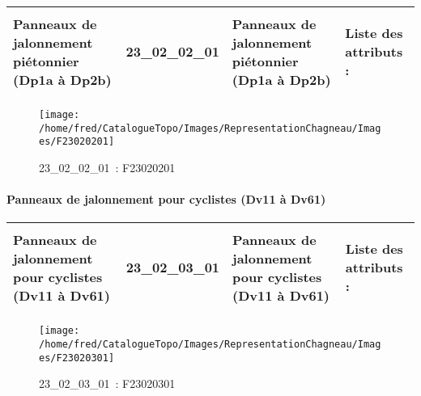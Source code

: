 \documentclass[12pt,titlepage,oneside]{book}
\begin{document}
\renewcommand{\arraystretch}{1.2}
\begin{supertabular}{|p{10cm}|c|p{13cm}|p{12cm}|}
 Panneaux de jalonnement piétonnier (Dp1a à Dp2b) & 23\_02\_02\_01 & Panneaux de jalonnement piétonnier (Dp1a à Dp2b) & Liste des attributs :
\begin{enumerate}
\end{enumerate}
\\
\hline
\end{supertabular}
\begin{figure}[h!]
  \hfill         %
  \begin{minipage}[t]{3cm}
    \begin{center}
      \texttt{[image: /home/fred/CatalogueTopo/Images/RepresentationChagneau/Images/F23020201]}
      \caption[~23\_02\_02\_01]{\small{23\_02\_02\_01~:} \tiny{F23020201}}\label{F23020201}
    \end{center}
  \end{minipage}
\end{figure}


\paragraph{Panneaux de jalonnement pour cyclistes (Dv11 à Dv61)}
\noindent
\vspace{\baselineskip}

\renewcommand{\arraystretch}{1.2}
\begin{supertabular}{|p{10cm}|c|p{13cm}|p{12cm}|}
 Panneaux de jalonnement pour cyclistes (Dv11 à Dv61) & 23\_02\_03\_01 & Panneaux de jalonnement pour cyclistes (Dv11 à Dv61) & Liste des attributs :
\begin{enumerate}
\end{enumerate}
\\
\hline
\end{supertabular}
\begin{figure}[h!]
  \hfill         %
  \begin{minipage}[t]{3cm}
    \begin{center}
      \texttt{[image: /home/fred/CatalogueTopo/Images/RepresentationChagneau/Images/F23020301]}
      \caption[~23\_02\_03\_01]{\small{23\_02\_03\_01~:} \tiny{F23020301}}\label{F23020301}
    \end{center}
  \end{minipage}
\end{figure}
\end{document}
